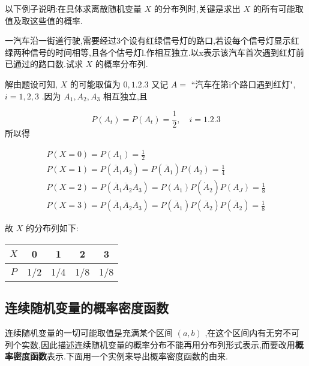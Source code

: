以下例子说明:在具体求离散随机变量 $ X $ 的分布列时,关键是求出 $ X $ 的所有可能取值及取这些值的概率.

\begin{example}\label{exam:2.1.5}
	一汽车沿一街道行驶,需要经过3个设有红绿信号灯的路口,若设每个信号灯显示红绿两种信号的时间相等,且各个估号灯l.作相互独立.以x表示该汽车首次遇到红灯前已通过的路口数.试求 $ X $ 的概率分布列.
	
	解由题设可知, $ X $ 的可能取值为 $ 0,1.2.3 $ 又记 $ A= $ ``汽车在第i个路口遇到红灯", $ i=1,2,3 $ .因为 $ A_1,A_2,A_3 $ 相互独立,且
	
	\[ 
	P\left(A_{t}\right)=P\left(A_{t}\right)=\frac{1}{2}, \quad i=1.2 .3
	\]
	所以得
	
	\[ 
	\begin{array}{l}
	{P(X=0)=P\left(A_{1}\right)=\frac{1}{2}} \\ 
	{P(X=1)=P\left(\overline{A}_{1} A_{2}\right)=P\left(\overline{A}_{1}\right) P\left(\Lambda_{2}\right)=\frac{1}{4}} \\ 
	{P(X=2)=P\left(\overline{A}_{1} \overline{A}_{2} A_{3}\right)=P\left(A_{1}\right) P\left(\dot{A}_{2}\right) P\left(A_{J}\right)=\frac{1}{8}}\\
	{P(X=3)=P\left(\overline{A}_{1} \overline{A}_{2} \overline{A}_{3}\right)=P\left(\overline{A}_{1}\right) P\left(\overline{A}_{2}\right) P\left(\overline{A}_{2}\right)=\frac{1}{8}}
	\end{array}
	\]
	
	故 $ X $ 的分布列如下:
	
	\begin{table}[htbp]
		\centering
		\begin{tabular}{c|cccc}
			 $ X $ & 0     & 1     & 2     & 3 \\\midrule
			 $ P $ & 1/2   & 1/4   & 1/8   & 1/8 \\
		\end{tabular}%
	\end{table}%
	
\end{example}

\subsection{连续随机变量的概率密度函数}\label{ssec:2.1.4}

连续随机变量的一切可能取值是充满某个区间 $ (a,b) $ ,在这个区间内有无穷不可列个实数,因此描述连续随机变量的概率分布不能再用分布列形式表示,而要改用\textbf{概率密度函数}表示.下面用一个实例来导出概率密度函数的由来.

